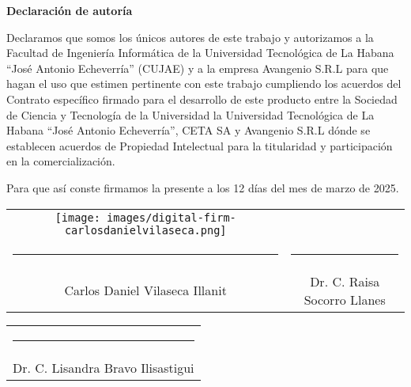 {\Large \textbf{Declaración de autoría} \vspace{.3cm}}

Declaramos que somos los únicos autores de este trabajo y autorizamos a la Facultad de Ingeniería Informática de la Universidad Tecnológica de La Habana ``José Antonio Echeverría'' (CUJAE) y a la empresa Avangenio S.R.L para que hagan el uso que estimen pertinente con este trabajo cumpliendo los acuerdos del Contrato específico firmado para el desarrollo de este producto entre la Sociedad de Ciencia y Tecnología de la Universidad la Universidad Tecnológica de La Habana ``José Antonio Echeverría'', CETA SA y Avangenio S.R.L dónde se establecen acuerdos de Propiedad Intelectual para la titularidad  y participación en la comercialización.

Para que así conste firmamos la presente a los 12 días del mes de marzo de 2025.

\vspace{3cm}

\begingroup

\setlength{\tabcolsep}{10pt}
\renewcommand{\arraystretch}{0.5}
\centering
\begin{tabular}{c c}
	\texttt{[image: images/digital-firm-carlosdanielvilaseca.png]} &                             \\
	\noindent\rule{6cm}{0.4pt}                                                & \noindent\rule{6cm}{0.4pt}  \\
	Carlos Daniel Vilaseca Illanit                                            & Dr. C. Raisa Socorro Llanes
\end{tabular}

\vspace{2cm}
\hspace{6cm}
\begin{tabular}{r}
	\\
	\noindent\rule{6.5cm}{0.4pt} \\
	Dr. C. Lisandra Bravo Ilisastigui
\end{tabular}

\vspace{3cm}

\endgroup
